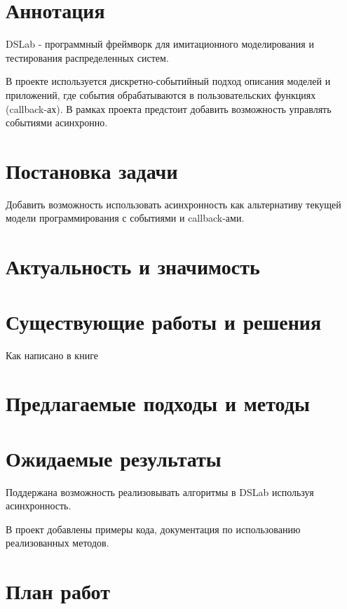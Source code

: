 

\section*{Аннотация}

DSLab - программный фреймворк для имитационного моделирования и тестирования распределенных систем.

В проекте используется дискретно-событийный подход описания моделей и приложений, где события обрабатываются в пользовательских функциях (callback-ах). В рамках проекта предстоит добавить возможность управлять событиями асинхронно.


\section{Постановка задачи}

Добавить возможность использовать асинхронность как альтернативу текущей модели программирования с событиями и callback-ами.

\section{Актуальность и значимость}

\section{Существующие работы и решения}

Как написано в книге


\section{Предлагаемые подходы и методы} 

\section{Ожидаемые результаты}

Поддержана возможность реализовывать алгоритмы в DSLab используя асинхронность. 

В проект добавлены примеры кода, документация по использованию реализованных методов.

\section{План работ}